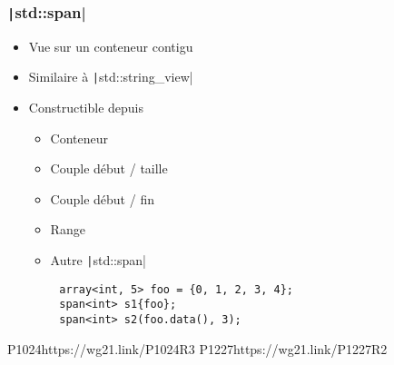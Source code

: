 \documentclass[C++.tex]{subfiles}
\begin{document}
\begin{frame}[fragile]
	\frametitle{\texttt|std::span|}
	\begin{itemize}
		\item Vue sur un conteneur contigu
		\item Similaire à \texttt|std::string_view|
		\item Constructible depuis 
		\begin{itemize}
			\item Conteneur
			\item Couple début / taille
			\item Couple début / fin
			\item Range
			\item Autre \texttt|std::span|
		\end{itemize}
	\end{itemize}

	\begin{verbatim}
		array<int, 5> foo = {0, 1, 2, 3, 4};
		span<int> s1{foo};
		span<int> s2(foo.data(), 3);
	\end{verbatim}

		{P1024}{https://wg21.link/P1024R3}
		{P1227}{https://wg21.link/P1227R2}
\end{frame}
\end{document}
